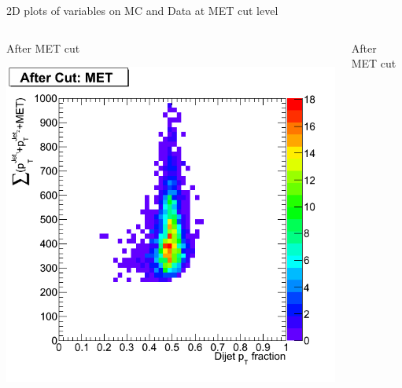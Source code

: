 \documentclass[8pt]{beamer}
\begin{document}
\begin{frame}{2D plots of variables on MC and Data at MET cut level} 
 
\begin{columns}

\column[t]{5.5cm}   
\begin{block}{After MET cut}
 
  \begin{center}
  \includegraphics[width=1.00\textwidth]{img/MET_dijetFrac_htMET_VBFInv.png}
  \end{center}

\end{block}

\column[t]{5.5cm}
\begin{block}{After MET cut}


\end{block}
\end{columns}
\end{frame}
\end{document}

